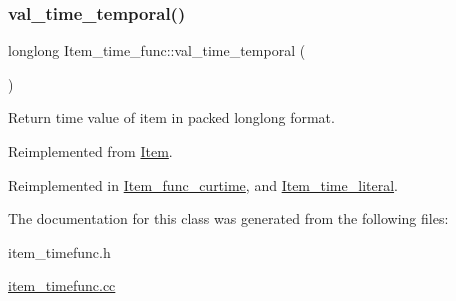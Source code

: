 \mbox{\label{classItem__time__func_ac6f281d250770126e010750dff54ef36}} 
\subsubsection{\texorpdfstring{val\+\_\+time\+\_\+temporal()}{val\_time\_temporal()}}
{\footnotesize\ttfamily longlong Item\+\_\+time\+\_\+func\+::val\+\_\+time\+\_\+temporal (\begin{DoxyParamCaption}{ }\end{DoxyParamCaption})\hspace{0.3cm}{\ttfamily [virtual]}}

Return time value of item in packed longlong format. 

Reimplemented from \mbox{\hyperlink{classItem_a69ef60a3917a1bb4832498a695754c58}{Item}}.



Reimplemented in \mbox{\hyperlink{classItem__func__curtime_a58e6e51156871d1b5e844993c88cf053}{Item\+\_\+func\+\_\+curtime}}, and \mbox{\hyperlink{classItem__time__literal_a38682be97c3300d176410c59ca436c1b}{Item\+\_\+time\+\_\+literal}}.



The documentation for this class was generated from the following files\+:\begin{DoxyCompactItemize}
\item 
item\+\_\+timefunc.\+h\item 
\mbox{\hyperlink{item__timefunc_8cc}{item\+\_\+timefunc.\+cc}}\end{DoxyCompactItemize}
